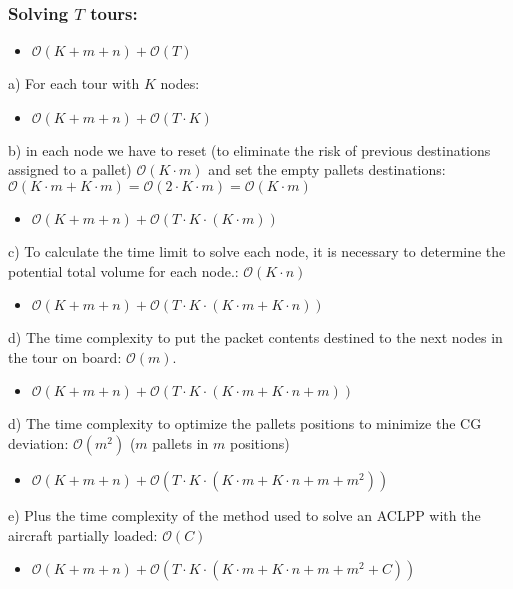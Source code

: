 \documentclass[preprint,authoryear]{elsarticle}
\begin{document}
{\subsubsection{Solving $T$ tours:}

\begin{itemize}
	\item $\mathcal{O}(K + m + n) + \mathcal{O}(T)$
\end{itemize}


a) For each tour with $K$ nodes:
\begin{itemize}
	\item $\mathcal{O}(K + m + n) + \mathcal{O}(T \cdot K)$
\end{itemize}


b) in each node we have to reset (to eliminate the risk of previous destinations assigned to a pallet) $\mathcal{O}(K \cdot m)$ and set the empty pallets destinations: $\mathcal{O}(K \cdot m + K \cdot m) = \mathcal{O}(2 \cdot K \cdot m) = \mathcal{O}(K \cdot m)$
\begin{itemize}
	\item $\mathcal{O}(K + m + n) + \mathcal{O}(T \cdot K \cdot (K \cdot m))$
\end{itemize}

c) To calculate the time limit to solve each node, it is necessary to determine the potential total volume for each node.: $\mathcal{O}(K \cdot n)$
\begin{itemize}
	\item $\mathcal{O}(K + m + n) + \mathcal{O}(T \cdot K \cdot (K \cdot m + K \cdot n))$
\end{itemize}

d) The time complexity to put the packet contents destined to the next nodes in the tour on board: $\mathcal{O}(m)$.
\begin{itemize}
	\item $\mathcal{O}(K + m + n) + \mathcal{O}(T \cdot K \cdot (K \cdot m + K \cdot n + m))$
\end{itemize}

d) The time complexity to optimize the pallets positions to minimize the CG deviation: $\mathcal{O}(m^2)$ ($m$ pallets in $m$ positions)
\begin{itemize}
	\item $\mathcal{O}(K + m + n) + \mathcal{O}(T \cdot K \cdot (K \cdot m + K \cdot n + m + m^2))$
\end{itemize}

e) Plus the time complexity of the method used to solve an ACLPP with the aircraft partially loaded: $\mathcal{O}(C)$
\begin{itemize}
	\item $\mathcal{O}(K + m + n) + \mathcal{O}(T \cdot K \cdot (K \cdot m + K \cdot n + m + m^2 + C))$
\end{itemize}

}
\end{document}
